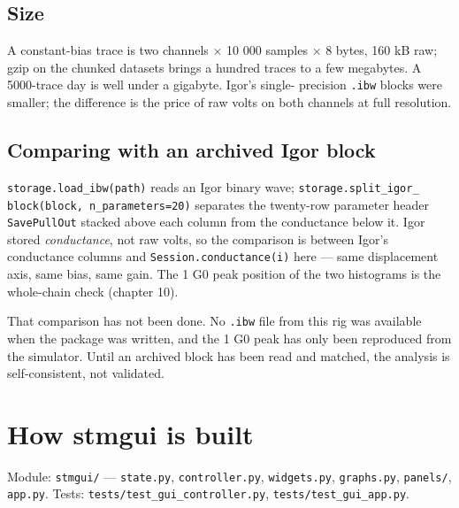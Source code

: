 \section{Size}

A constant-bias trace is two channels $\times$ 10 000 samples $\times$ 8 bytes, 160 kB raw; gzip on the chunked datasets brings a hundred traces to a few megabytes. A 5000-trace day is well under a gigabyte. Igor's single- precision \texttt{.\discretionary{}{}{}ibw} blocks were smaller; the difference is the price of raw volts on both channels at full resolution.

\section{Comparing with an archived Igor block}

\texttt{storage.\discretionary{}{}{}load\_\discretionary{}{}{}ibw(path)} reads an Igor binary wave; \texttt{storage.\discretionary{}{}{}split\_\discretionary{}{}{}igor\_\discretionary{}{}{} block(block,\discretionary{}{}{} n\_\discretionary{}{}{}parameters=20)} separates the twenty-row parameter header \texttt{Save\discretionary{}{}{}Pull\discretionary{}{}{}Out} stacked above each column from the conductance below it. Igor stored \emph{conductance}, not raw volts, so the comparison is between Igor's conductance columns and \texttt{Session.\discretionary{}{}{}conductance(i)} here --- same displacement axis, same bias, same gain. The 1 G0 peak position of the two histograms is the whole-chain check (chapter 10).

\begin{keybox}
That comparison has not been done. No \texttt{.\discretionary{}{}{}ibw} file from this rig was available when the package was written, and the 1 G0 peak has only been reproduced from the simulator. Until an archived block has been read and matched, the analysis is self-consistent, not validated.
\end{keybox}

\setcounter{chapter}{47}
\chapter{How stmgui is built}

\begin{keybox}\small Module: \texttt{stmgui/\discretionary{}{}{}} --- \texttt{state.\discretionary{}{}{}py}, \texttt{controller.\discretionary{}{}{}py}, \texttt{widgets.\discretionary{}{}{}py}, \texttt{graphs.\discretionary{}{}{}py}, \texttt{panels/\discretionary{}{}{}}, \texttt{app.\discretionary{}{}{}py}. Tests: \texttt{tests/\discretionary{}{}{}test\_\discretionary{}{}{}gui\_\discretionary{}{}{}controller.\discretionary{}{}{}py}, \texttt{tests/\discretionary{}{}{}test\_\discretionary{}{}{}gui\_\discretionary{}{}{}app.\discretionary{}{}{}py}.\end{keybox}

